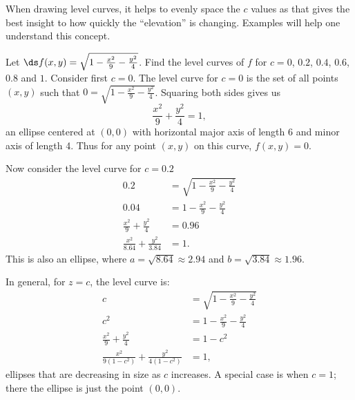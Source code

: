 When drawing level curves, it helps to evenly space the $c$ values as that gives the best insight to how quickly the ``elevation'' is changing. Examples will help one understand this concept.

\begin{example}\label{ex_levelcurve1}%
Let $\ds f(x,y) = \sqrt{1-\frac{x^2}9-\frac{y^2}4}$. Find the level curves of $f$ for $c=0$, $0.2$, $0.4$, $0.6$, $0.8$ and $1$.
\solution
Consider first $c=0$. The level curve for $c=0$ is the set of all points $(x,y)$ such that $0=\sqrt{1-\frac{x^2}9-\frac{y^2}4}$. Squaring both sides  gives us
\[\frac{x^2}9+\frac{y^2}4=1,\]
an ellipse centered at $(0,0)$ with horizontal major axis of length 6 and minor axis of length 4. Thus for any point $(x,y)$ on this curve, $f(x,y) = 0$.

Now consider the level curve for $c=0.2$
\begin{align*}
0.2 &= \sqrt{1-\frac{x^2}9-\frac{y^2}4}\\
0.04 &= 1-\frac{x^2}9-\frac{y^2}4\\
\frac{x^2}9+\frac{y^2}4 &=0.96\\
\frac{x^2}{8.64}+\frac{y^2}{3.84} &=1.
\end{align*}
This is also an ellipse, where $a = \sqrt{8.64}\approx 2.94$ and $b=\sqrt{3.84}\approx 1.96$.

In general, for $z=c$, the level curve is:
\begin{align*}
c &= \sqrt{1-\frac{x^2}9-\frac{y^2}4}\\
c^2 &= 1-\frac{x^2}9-\frac{y^2}4\\
\frac{x^2}9+\frac{y^2}4 &=1-c^2\\
\frac{x^2}{9(1-c^2)}+\frac{y^2}{4(1-c^2)} &=1,
\end{align*}
ellipses that are decreasing in size as $c$ increases. A special case is when $c=1$; there the ellipse is just the point $(0,0)$. 


\end{example}
